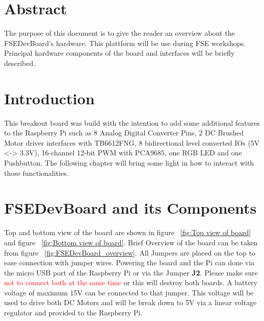 \documentclass[
10pt, %
a4paper, %
oneside, %
headinclude,footinclude, %
BCOR=5mm, %
table,
]{scrartcl}
\begin{document}
\section*{Abstract} %
The purpose of this document is to give the reader an overview about the FSEDevBoard's hardware. This plattform will be use during FSE workshops. Principal hardware components of the board and interfaces will be briefly described.

%
\newpage
%

\section{Introduction}
This breakout board was build with the intention to add some additional features to the Raspberry Pi such as 8 Analog Digital Converter Pins, 2 DC Brushed Motor driver interfaces with TB6612FNG, 8 bidirectional level converted IOs (5V <-> 3.3V), 16-channel 12-bit PWM with PCA9685, one RGB LED and one Pushbutton. The following chapter will bring some light in how to interact with those functionalities.

\section{FSEDevBoard and its Components}
Top and bottom view of the board are shown in figure ~\vref{fig:Top view of board} and figure ~\vref{fig:Bottom view of board}. Brief Overview of the board can be taken from figure ~\vref{fig:FSEDevBoard_overview}. All Jumpers are placed on the top to ease connection with jumper wires.
Powering the board and the Pi can done via the micro USB port of the Raspberry Pi or via the Jumper \textbf{J2}. Please make sure \textcolor{red}{not to connect both at the same time} or this will destroy both boards. A battery voltage of maximum 15V can be connected to that jumper. This voltage will be used to drive both DC Motors and will be break down to 5V via a linear voltage regulator and provided to the Raspberry Pi.
\end{document}
